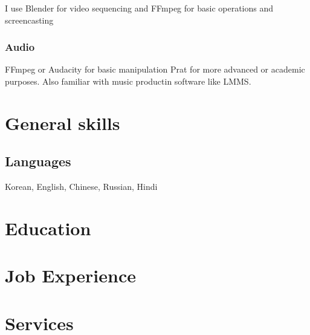 \documentclass{article}
\begin{document}
I use Blender for video sequencing and FFmpeg for basic operations and screencasting

\subsubsection{Audio}

FFmpeg or Audacity for basic manipulation Prat for more advanced or academic purposes. Also familiar with music productin software like LMMS.

\section{General skills}

\subsection{Languages}

Korean, English, Chinese, Russian, Hindi

\section{Education}

\section{Job Experience}

\section{Services}
\end{document}
